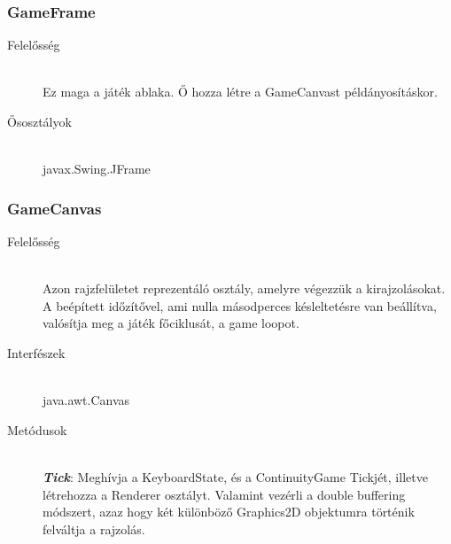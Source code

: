 \subsubsection{GameFrame}
	\begin{description}
	\item[Felelősség] \hfill \\
	Ez maga a játék ablaka. Ő hozza létre a GameCanvast példányosításkor.
	
	\item[Ősosztályok] \hfill \\
	javax.Swing.JFrame
	
	\end{description}
	
\subsubsection{GameCanvas}
	\begin{description}
	\item[Felelősség] \hfill \\
	Azon rajzfelületet reprezentáló osztály, amelyre végezzük a kirajzolásokat. A beépített időzítővel, ami nulla másodperces késleltetésre van beállítva, valósítja meg a játék főciklusát, a game loopot.
	\item[Interfészek] \hfill \\
	java.awt.Canvas
	\item[Metódusok] \hfill \\
	\textbf{\emph{Tick}}: Meghívja a KeyboardState, és a ContinuityGame Tickjét, illetve létrehozza a Renderer osztályt. Valamint vezérli a double buffering módszert, azaz hogy két különböző Graphics2D objektumra történik felváltja a rajzolás.
	\end{description}
	
